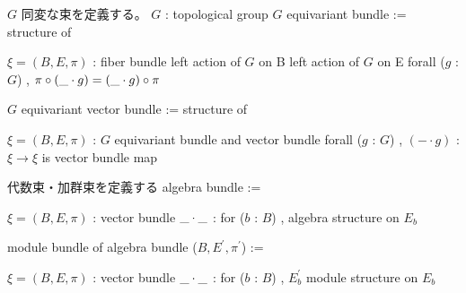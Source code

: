 \begin{Definition}
\itemnote
  \(G\) 同変な束を定義する。
\itemwhen
  \Fix \(G\) : topological group
\itemdefi
  \Define \(G\) equivariant bundle := structure of
  \begin{itemize}
    \itembase \(\xi = (B , E , \pi)\) : fiber bundle
    \itemenum left action of \(G\) on B
    \itemenum left action of \(G\) on E
    \itemwith forall (\(g\) : \(G\)) , \(\pi \circ (\_ \cdot g) = (\_ \cdot g) \circ \pi\)
  \end{itemize}
\itemdefi
  \Define \(G\) equivariant vector bundle := structure of
  \begin{itemize}
    \itembase \(\xi = (B , E , \pi)\) : \(G\) equivariant bundle and vector bundle
    \itemwith
      forall (\(g\) : \(G\)) , \((- \cdot g)\) : \(\xi \to \xi\) is vector bundle map
  \end{itemize}
\end{Definition}

\begin{Definition}
\itemnote 代数束・加群束を定義する
\itemdefi 
  \Define algebra bundle :=
  \begin{itemize}
    \itembase \(\xi = (B , E , \pi)\) : vector bundle
    \itemenum \(\_ \cdot \_\) :
      for (\(b\) : \(B\)) , algebra structure on \(E_b\)
    \itemwith {}
  \end{itemize}
\itemdefi
  \Define module bundle of algebra bundle (\(B , E^{\prime} , \pi^{\prime}\)) :=
  \begin{itemize}
    \itembase \(\xi = (B , E , \pi)\) : vector bundle
    \itemenum \(\_ \cdot \_\) :
      for (\(b\) : \(B\)) , \(E^{\prime}_b\) module structure on \(E_b\) 
    \itemwith {}
  \end{itemize}
\end{Definition}